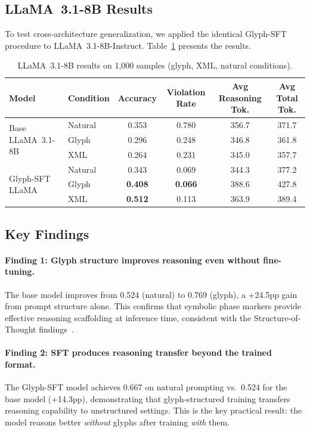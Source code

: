 \documentclass[11pt]{article}
\begin{document}
\subsection{LLaMA~3.1-8B Results}

To test cross-architecture generalization, we applied the identical Glyph-SFT procedure to LLaMA~3.1-8B-Instruct. Table~\ref{tab:llama_results} presents the results.

\begin{table}[h]
\centering
\caption{LLaMA~3.1-8B results on 1{,}000 samples (glyph, XML, natural conditions).}
\label{tab:llama_results}
\begin{tabular}{@{}llcccc@{}}
\toprule
\textbf{Model} & \textbf{Condition} & \textbf{Accuracy} & \textbf{Violation Rate} & \textbf{Avg Reasoning Tok.} & \textbf{Avg Total Tok.} \\
\midrule
\multirow{3}{*}{Base LLaMA~3.1-8B}
    & Natural & 0.353 & 0.780 & 356.7 & 371.7 \\
    & Glyph   & 0.296 & 0.248 & 346.8 & 361.8 \\
    & XML     & 0.264 & 0.231 & 345.0 & 357.7 \\
\midrule
\multirow{3}{*}{Glyph-SFT LLaMA}
    & Natural & 0.343 & 0.069 & 344.3 & 377.2 \\
    & Glyph   & \textbf{0.408} & \textbf{0.066} & 388.6 & 427.8 \\
    & XML     & \textbf{0.512} & 0.113 & 363.9 & 389.4 \\
\bottomrule
\end{tabular}
\end{table}

\subsection{Key Findings}

\paragraph{Finding 1: Glyph structure improves reasoning even without fine-tuning.}
The base model improves from 0.524 (natural) to 0.769 (glyph), a +24.5pp gain from prompt structure alone. This confirms that symbolic phase markers provide effective reasoning scaffolding at inference time, consistent with the Structure-of-Thought findings~\citep{t2sbench2025}.

\paragraph{Finding 2: SFT produces reasoning transfer beyond the trained format.}
The Glyph-SFT model achieves 0.667 on natural prompting vs.\ 0.524 for the base model (+14.3pp), demonstrating that glyph-structured training transfers reasoning capability to unstructured settings. This is the key practical result: the model reasons better \textit{without} glyphs after training \textit{with} them.
\end{document}
